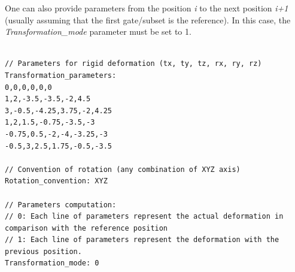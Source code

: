 \documentclass[a4paper, 11pt]{article}
\begin{document}
One can also provide parameters from the position \textit{i} to the next position \textit{i+1} (usually assuming that the first gate/subset is the reference). In this case, the \textit{Transformation\_mode} parameter must be set to 1. 

\begin{lstlisting}[label={list_rmotion_conf},caption= Example of a configuration file for rigid transformation.]

// Parameters for rigid deformation (tx, ty, tz, rx, ry, rz)
Transformation_parameters:
0,0,0,0,0,0
1,2,-3.5,-3.5,-2,4.5
3,-0.5,-4.25,3.75,-2,4.25
1,2,1.5,-0.75,-3.5,-3
-0.75,0.5,-2,-4,-3.25,-3
-0.5,3,2.5,1.75,-0.5,-3.5

// Convention of rotation (any combination of XYZ axis)
Rotation_convention: XYZ

// Parameters computation:
// 0: Each line of parameters represent the actual deformation in comparison with the reference position
// 1: Each line of parameters represent the deformation with the previous position. 
Transformation_mode: 0

\end{lstlisting}   









\clearpage
\end{document}
